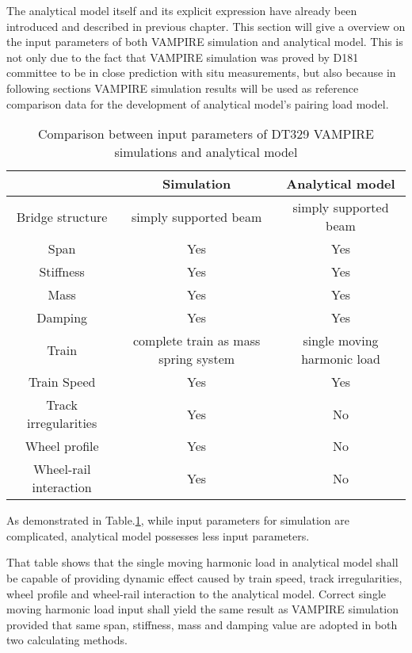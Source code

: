 The analytical model itself and its explicit expression have already been introduced and described in previous chapter. This section will give a overview on the input parameters of both VAMPIRE simulation and analytical model. This is not only due to the fact that VAMPIRE simulation was proved by D181 committee to be in close prediction with situ measurements, but also because in following sections VAMPIRE simulation results will be used as reference comparison data for the development of analytical model's pairing load model. 

\begin{table}[h!]
    \centering
    \caption{Comparison between input parameters of DT329 VAMPIRE simulations and analytical model}
    \begin{tabular}{c|cc}
        \hline
        & Simulation & Analytical model \\
        \hline
        Bridge structure & simply supported beam & simply supported beam \\
        Span & Yes & Yes \\
        Stiffness & Yes & Yes \\
        Mass & Yes & Yes \\
        Damping & Yes & Yes \\
        Train & complete train as mass spring system & single moving harmonic load \\
        Train Speed & Yes & Yes \\
        Track irregularities & Yes & No \\
        Wheel profile & Yes & No \\
        Wheel-rail interaction & Yes & No \\
        \hline
    \end{tabular}
    \label{tab:comparisonsimulationanalytical}
\end{table}

As demonstrated in Table.\ref{tab:comparisonsimulationanalytical}, while input parameters for simulation are complicated, analytical model possesses less input parameters. 

That table shows that the single moving harmonic load in analytical model shall be capable of providing dynamic effect caused by train speed, track irregularities, wheel profile and wheel-rail interaction to the analytical model. Correct single moving harmonic load input shall yield the same result as VAMPIRE simulation provided that same span, stiffness, mass and damping value are adopted in both two calculating methods.

